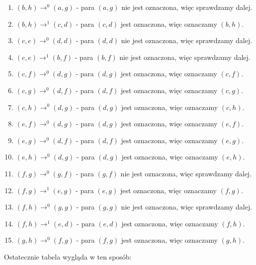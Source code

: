 \documentclass{article}
\begin{document}
\begin{enumerate}
        \item $(b,h) \rightarrow^0 (a, g)$ - para $(a, g)$ nie jest oznaczona, więc sprawdzamy dalej.
        \item $(b,h) \rightarrow^1 (c, d)$ - para $(c, d)$ jest oznaczona, więc oznaczamy $(b, h)$.
        \item $(c,e) \rightarrow^0 (d, d)$ - para $(d, d)$ nie jest oznaczona, więc sprawdzamy dalej.
        \item $(c,e) \rightarrow^1 (b, f)$ - para $(b, f)$ nie jest oznaczona, więc sprawdzamy dalej.
        \item $(c,f) \rightarrow^0 (d, g)$ - para $(d, g)$ jest oznaczona, więc oznaczamy $(c, f)$.
        \item $(c,g) \rightarrow^0 (d, f)$ - para $(d, f)$ jest oznaczona, więc oznaczamy $(c, g)$.
        \item $(c,h) \rightarrow^0 (d, g)$ - para $(d, g)$ jest oznaczona, więc oznaczamy $(c, h)$.
        \item $(e,f) \rightarrow^0 (d, g)$ - para $(d, g)$ jest oznaczona, więc oznaczamy $(e, f)$.
        \item $(e,g) \rightarrow^0 (d, f)$ - para $(d, f)$ jest oznaczona, więc oznaczamy $(e, g)$.
        \item $(e,h) \rightarrow^0 (d, g)$ - para $(d, g)$ jest oznaczona, więc oznaczamy $(e, h)$.
        \item $(f,g) \rightarrow^0 (g, f)$ - para $(g, f)$ nie jest oznaczona, więc sprawdzamy dalej.
        \item $(f,g) \rightarrow^1 (e, g)$ - para $(e, g)$ jest oznaczona, więc oznaczamy $(f, g)$.
        \item $(f,h) \rightarrow^0 (g, g)$ - para $(g, g)$ nie jest oznaczona, więc sprawdzamy dalej.
        \item $(f,h) \rightarrow^1 (e, d)$ - para $(e, d)$ jest oznaczona, więc oznaczamy $(f, h)$.
        \item $(g,h) \rightarrow^0 (f, g)$ - para $(f, g)$ jest oznaczona, więc oznaczamy $(g, h)$.
    \end{enumerate}
    
    Ostatecznie tabela wygląda w ten sposób:
\end{document}
